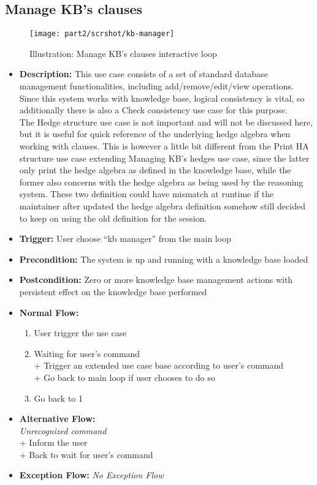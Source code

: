 \documentclass[../gr-final.tex]{subfiles}
\begin{document}
\subsection{Manage KB's clauses}
\begin{figure}[H]
  \centering
  \texttt{[image: part2/scrshot/kb-manager]}
  \caption{Illustration: Manage KB's clauses interactive loop}
\end{figure}
\begin{itemize}
  \item {\bfseries Description:} This use case consists of a set
    of standard database management functionalities, 
    including add/remove/edit/view operations. Since this system
    works with knowledge base, logical consistency is vital,
    so additionally there is also a Check consistency use case
    for this purpose.\\
    The Hedge structure use case is not
    important and will not be discussed here, but it is useful for 
    quick reference of the underlying
    hedge algebra when working with clauses. This is however a
    little bit different from the Print HA structure use case extending
    Managing KB's hedges use case, since the latter only print
    the hedge algebra as defined in the knowledge base, while the
    former also concerns with the hedge algebra as being used by
    the reasoning system. These two definition could have mismatch
    at runtime if the maintainer after updated the hedge algebra
    definition somehow still decided to keep on using the old
    definition for the session.
  \item {\bfseries Trigger:} User choose ``kb manager'' from the
    main loop
  \item {\bfseries Precondition:} The system is up and running
    with a knowledge base loaded    
  \item {\bfseries Postcondition:} Zero or more knowledge base management
    actions with persistent effect on the knowledge base performed
  \item {\bfseries Normal Flow:}
    \begin{enumerate}
      \item User trigger the use case
      \item Waiting for user's command\\
      \indent + Trigger an extended use case base according to
      user's command\\
      \indent + Go back to main loop if user chooses to do so
      \item Go back to 1
    \end{enumerate}
  \item {\bfseries Alternative Flow:}\\
    {\em Unrecognized command}\\
    \indent + Inform the user\\
    \indent + Back to wait for user's command
  \item {\bfseries Exception Flow:} {\em No Exception Flow}
\end{itemize}
\end{document}
